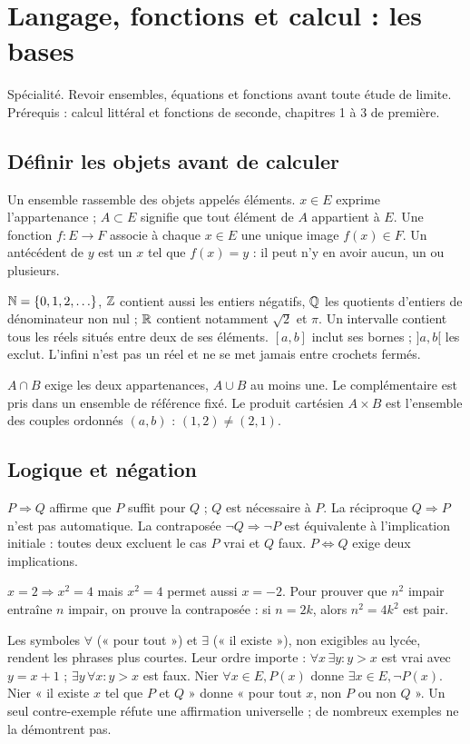 \documentclass[../cours_tle.tex]{subfiles}
\begin{document}
\setcounter{chapter}{0}
\chapter{Langage, fonctions et calcul : les bases}
\label{ch:1}
\begin{objectif}
Spécialité. Revoir ensembles, équations et fonctions avant toute étude de limite. Prérequis : calcul littéral et fonctions de seconde, chapitres 1 à 3 de première.
\end{objectif}
\section{Définir les objets avant de calculer}
\begin{definition}
Un ensemble rassemble des objets appelés éléments. $x\in E$ exprime l'appartenance ; $A\subset E$ signifie que tout élément de $A$ appartient à $E$.
Une fonction $f:E\to F$ associe à chaque $x\in E$ une unique image $f(x)\in F$.
Un antécédent de $y$ est un $x$ tel que $f(x)=y$ : il peut n'y en avoir aucun, un ou plusieurs.
\end{definition}
$\mathbb{N}=\{0,1,2,\ldots\}$, $\mathbb{Z}$ contient aussi les entiers négatifs, $\mathbb{Q}$ les quotients d'entiers de dénominateur non nul ; $\mathbb{R}$ contient notamment $\sqrt2$ et $\pi$.
Un intervalle contient tous les réels situés entre deux de ses éléments. $[a,b]$ inclut ses bornes ; $]a,b[$ les exclut. L'infini n'est pas un réel et ne se met jamais entre crochets fermés.

$A\cap B$ exige les deux appartenances, $A\cup B$ au moins une. Le complémentaire est pris dans un ensemble de référence fixé. Le produit cartésien $A\times B$ est l'ensemble des couples ordonnés $(a,b)$ : $(1,2)\ne(2,1)$.
\section{Logique et négation}
$P\Rightarrow Q$ affirme que $P$ suffit pour $Q$ ; $Q$ est nécessaire à $P$.
La réciproque $Q\Rightarrow P$ n'est pas automatique. La contraposée $\neg Q\Rightarrow\neg P$ est équivalente à l'implication initiale : toutes deux excluent le cas $P$ vrai et $Q$ faux.
$P\Leftrightarrow Q$ exige deux implications.

\begin{exemple}
$x=2\Rightarrow x^2=4$ mais $x^2=4$ permet aussi $x=-2$.
Pour prouver que $n^2$ impair entraîne $n$ impair, on prouve la contraposée : si $n=2k$, alors $n^2=4k^2$ est pair.
\end{exemple}
Les symboles $\forall$ (« pour tout ») et $\exists$ (« il existe »), non exigibles au lycée, rendent les phrases plus courtes. Leur ordre importe : $\forall x\,\exists y:y>x$ est vrai avec $y=x+1$ ; $\exists y\,\forall x:y>x$ est faux.
Nier $\forall x\in E,P(x)$ donne $\exists x\in E,\neg P(x)$.
Nier « il existe $x$ tel que $P$ et $Q$ » donne « pour tout $x$, non $P$ ou non $Q$ ».
Un seul contre-exemple réfute une affirmation universelle ; de nombreux exemples ne la démontrent pas.
\end{document}
